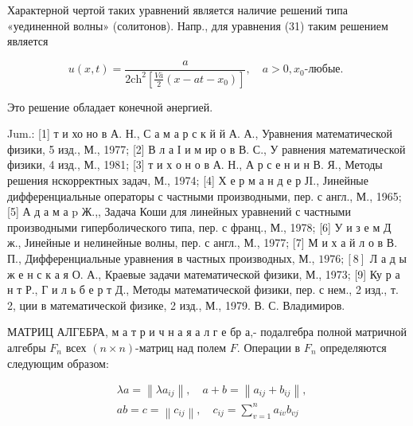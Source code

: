 \documentclass[10pt]{article}
\begin{document}
Характерной чертой таких уравнений является наличие решений типа «уединенной волны» (солитонов). Напр., для уравнения (31) таким решением является



\[

u(x, t)=\frac{a}{2 \mathrm{ch}^{2}\left[\frac{V \bar{a}}{2}\left(x-a t-x_{0}\right)\right]}, \quad a>0, x_{0} \text {-любые. }

\]



Это решение обладает конечной әнергией.



Jum.: [1] т и хо но в А. Н., С а м а р с к й й А. А., Уравнения математической физики, 5 изд., М., 1977; [2] В л а І и м ир о в В. С., У равнения математической физики, 4 изд., М., 1981; [3] т и х о н о в А. Н., А р с е н и н В. Я., Методы решения нскорректных задач, М., 1974; [4] Х е р м а н д е р ЈI., Јинейные дифференциальные операторы с частными производными, пер. с англ., М., 1965; [5] А д а м а p Ж.,, Задача Коши для линейных уравнений с частными производными гиперболического типа, пер. с франц., М., 1978; [6] У и з е м Д ж., Јинейные и нелинейные волны, пер. с англ., М., 1977; [7] М и х а й л о в В. П., Дифференциальные уравнения в частных производных, М., $1976 ;[8]$ Л а д ы ж е н с к а я О. А., Краевые задачи математической физики, М., 1973; [9] Ку р а н т Р., Г и л ь б е р т Д., Методы математической физики, пер. с нем., 2 изд., т. 2, ции в математической физике, 2 изд., М., 1979. В. С. Владимиров.



МАТРИЦ АЛГЕБРА, м а т р и ч н а я а л г е бр а,- подалгебра полной матричной алгебры $F_{n}$ всех $(n \times n)$-матриц над полем $F$. Операции в $F_{n}$ определяются следующим образом:



\[

\begin{aligned}

& \lambda a=\left\|\lambda a_{i j}\right\|, \quad a+b=\left\|a_{i j}+b_{i j}\right\|, \\

& a b=c=\left\|c_{i j}\right\|, \quad c_{i j}=\sum_{v=1}^{n} a_{i v} b_{v j}

\end{aligned}

\]
\end{document}
